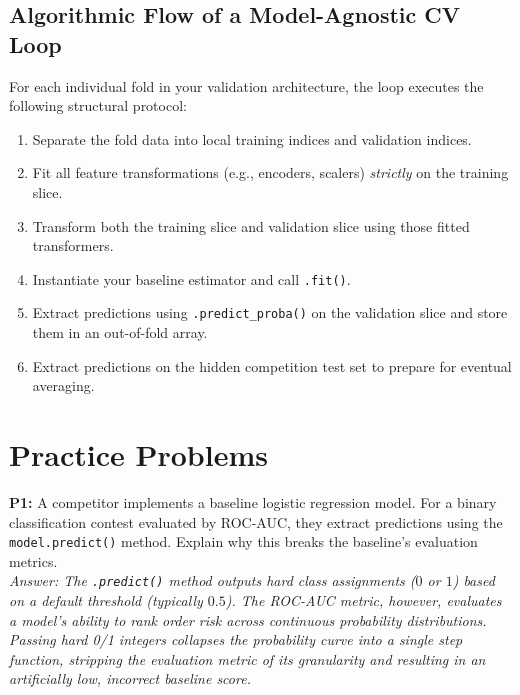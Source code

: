 \documentclass{article}
\begin{document}
\subsection{Algorithmic Flow of a Model-Agnostic CV Loop}
For each individual fold in your validation architecture, the loop executes the following structural protocol:
\begin{enumerate}
    \item Separate the fold data into local training indices and validation indices.
    \item Fit all feature transformations (e.g., encoders, scalers) \textit{strictly} on the training slice.
    \item Transform both the training slice and validation slice using those fitted transformers.
    \item Instantiate your baseline estimator and call \texttt{.fit()}.
    \item Extract predictions using \texttt{.predict\_proba()} on the validation slice and store them in an out-of-fold array.
    \item Extract predictions on the hidden competition test set to prepare for eventual averaging.
\end{enumerate}

\newpage
\section{Practice Problems}

\textbf{P1:} A competitor implements a baseline logistic regression model. For a binary classification contest evaluated by ROC-AUC, they extract predictions using the \texttt{model.predict()} method. Explain why this breaks the baseline's evaluation metrics.
\\
\textit{Answer: The \texttt{.predict()} method outputs hard class assignments ($0$ or $1$) based on a default threshold (typically $0.5$). The ROC-AUC metric, however, evaluates a model's ability to rank order risk across continuous probability distributions. Passing hard 0/1 integers collapses the probability curve into a single step function, stripping the evaluation metric of its granularity and resulting in an artificially low, incorrect baseline score.}
\end{document}
